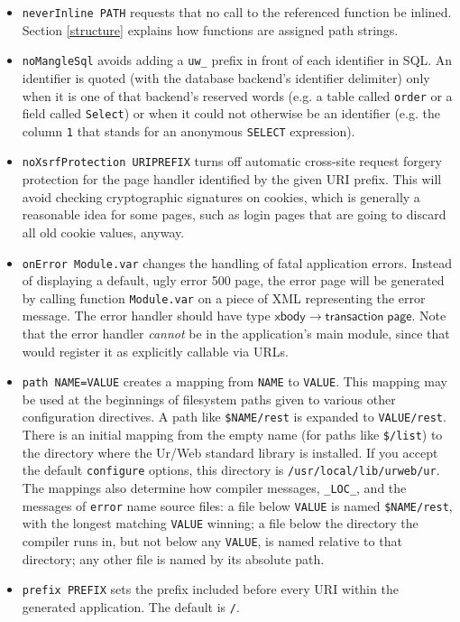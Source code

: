 \documentclass{article}
\newcommand{\mt}[1]{\mathsf{#1}}
\begin{document}
\begin{itemize}
\item \texttt{neverInline PATH} requests that no call to the referenced function be inlined.  Section \ref{structure} explains how functions are assigned path strings.
\item \texttt{noMangleSql} avoids adding a \texttt{uw\_} prefix in front of each identifier in SQL.  An identifier is quoted (with the database backend's identifier delimiter) only when it is one of that backend's reserved words (e.g. a table called \texttt{order} or a field called \texttt{Select}) or when it could not otherwise be an identifier (e.g. the column \texttt{1} that stands for an anonymous \texttt{SELECT} expression).
\item \texttt{noXsrfProtection URIPREFIX} turns off automatic cross-site request forgery protection for the page handler identified by the given URI prefix.  This will avoid checking cryptographic signatures on cookies, which is generally a reasonable idea for some pages, such as login pages that are going to discard all old cookie values, anyway.
\item \texttt{onError Module.var} changes the handling of fatal application errors.  Instead of displaying a default, ugly error 500 page, the error page will be generated by calling function \texttt{Module.var} on a piece of XML representing the error message.  The error handler should have type $\mt{xbody} \to \mt{transaction} \; \mt{page}$.  Note that the error handler \emph{cannot} be in the application's main module, since that would register it as explicitly callable via URLs.
\item \texttt{path NAME=VALUE} creates a mapping from \texttt{NAME} to \texttt{VALUE}.  This mapping may be used at the beginnings of filesystem paths given to various other configuration directives.  A path like \texttt{\$NAME/rest} is expanded to \texttt{VALUE/rest}.  There is an initial mapping from the empty name (for paths like \texttt{\$/list}) to the directory where the Ur/Web standard library is installed.  If you accept the default \texttt{configure} options, this directory is \texttt{/usr/local/lib/urweb/ur}.  The mappings also determine how compiler messages, \texttt{\_LOC\_}, and the messages of \texttt{error} name source files: a file below \texttt{VALUE} is named \texttt{\$NAME/rest}, with the longest matching \texttt{VALUE} winning; a file below the directory the compiler runs in, but not below any \texttt{VALUE}, is named relative to that directory; any other file is named by its absolute path.
\item \texttt{prefix PREFIX} sets the prefix included before every URI within the generated application.  The default is \texttt{/}.

\end{itemize}
\end{document}
